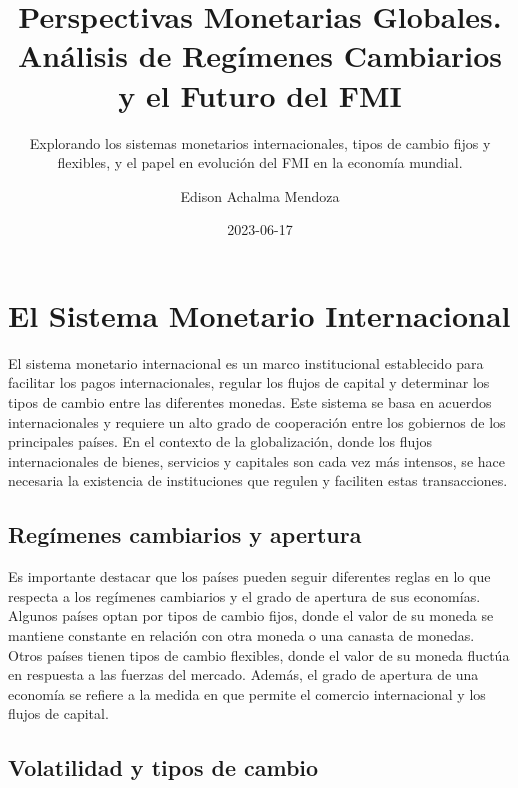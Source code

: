 \documentclass[
  letterpaper,
  DIV=11,
  numbers=noendperiod]{scrartcl}
\title{Perspectivas Monetarias Globales. Análisis de Regímenes
Cambiarios y el Futuro del FMI}
\subtitle{Explorando los sistemas monetarios internacionales, tipos de
cambio fijos y flexibles, y el papel en evolución del FMI en la economía
mundial.}
\author{Edison Achalma Mendoza}
\date{2023-06-17}
\begin{document}
\maketitle
\ifdefined\Shaded\renewenvironment{Shaded}{\begin{tcolorbox}[sharp corners, boxrule=0pt, borderline west={3pt}{0pt}{shadecolor}, breakable, interior hidden, frame hidden, enhanced]}{\end{tcolorbox}}\fi

\hypertarget{el-sistema-monetario-internacional}{%
\section{El Sistema Monetario
Internacional}\label{el-sistema-monetario-internacional}}

El sistema monetario internacional es un marco institucional establecido
para facilitar los pagos internacionales, regular los flujos de capital
y determinar los tipos de cambio entre las diferentes monedas. Este
sistema se basa en acuerdos internacionales y requiere un alto grado de
cooperación entre los gobiernos de los principales países. En el
contexto de la globalización, donde los flujos internacionales de
bienes, servicios y capitales son cada vez más intensos, se hace
necesaria la existencia de instituciones que regulen y faciliten estas
transacciones.

\hypertarget{reguxedmenes-cambiarios-y-apertura}{%
\subsection{Regímenes cambiarios y
apertura}\label{reguxedmenes-cambiarios-y-apertura}}

Es importante destacar que los países pueden seguir diferentes reglas en
lo que respecta a los regímenes cambiarios y el grado de apertura de sus
economías. Algunos países optan por tipos de cambio fijos, donde el
valor de su moneda se mantiene constante en relación con otra moneda o
una canasta de monedas. Otros países tienen tipos de cambio flexibles,
donde el valor de su moneda fluctúa en respuesta a las fuerzas del
mercado. Además, el grado de apertura de una economía se refiere a la
medida en que permite el comercio internacional y los flujos de capital.

\hypertarget{volatilidad-y-tipos-de-cambio}{%
\subsection{Volatilidad y tipos de
cambio}\label{volatilidad-y-tipos-de-cambio}}
\end{document}
